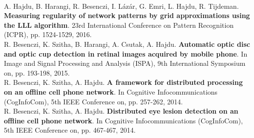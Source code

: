 \documentclass[b5paper,12pt]{report}
\theoremstyle{definition}
\begin{document}
\begin{singlespace}
\\[10pt]
\noindent
A. Hajdu, B. Harangi, R. Besenczi, I. Lázár, G. Emri, L. Hajdu, R. Tijdeman. {\bf{Measuring regularity of network patterns by grid approximations using the LLL algorithm}}. 23rd International Conference on Pattern Recognition (ICPR), pp. 1524-1529, 2016.
\\[10pt]
\noindent
R. Besenczi, K. Szitha, B. Harangi, A. Csutak, A. Hajdu. {\bf{Automatic optic disc and optic cup detection in retinal images acquired by mobile phone}}. In Image and Signal Processing and Analysis (ISPA), 9th International Symposium on, pp. 193-198, 2015.
\\[10pt]
\noindent
R. Besenczi, K. Szitha, A. Hajdu. {\bf{A framework for distributed processing on an offline cell phone network}}. In Cognitive Infocommunications (CogInfoCom), 5th IEEE Conference on, pp. 257-262, 2014.
\\[10pt]
\noindent
R. Besenczi, K. Szitha, A. Hajdu. {\bf{Distributed eye lesion detection on an offline cell phone network}}. In Cognitive Infocommunications (CogInfoCom), 5th IEEE Conference on, pp. 467-467, 2014.

\end{singlespace}
\end{document}
